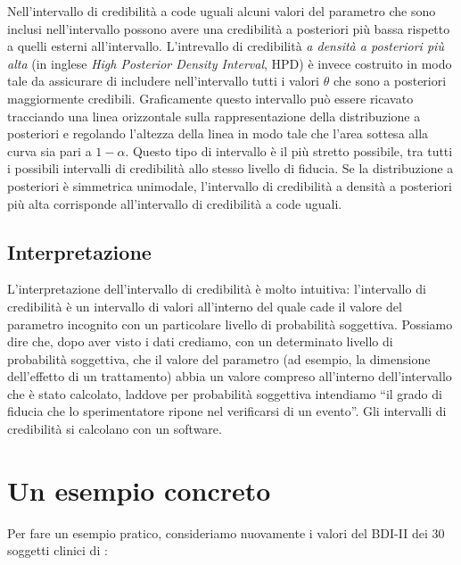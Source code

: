 \documentclass[
  11pt,
  italian,
  a4paper,
  extrafontsizes,onecolumn,openright
  ]{memoir}
\begin{document}
Nell'intervallo di credibilità a code uguali alcuni valori del parametro che sono inclusi nell'intervallo possono avere una credibilità a posteriori più bassa rispetto a quelli esterni all'intervallo. L'intrevallo di credibilità \emph{a densità a posteriori più alta} (in inglese \emph{High Posterior Density Interval}, HPD) è invece costruito in modo tale da assicurare di includere nell'intervallo tutti i valori \(\theta\) che sono a posteriori maggiormente credibili. Graficamente questo intervallo può essere ricavato tracciando una linea orizzontale sulla rappresentazione della distribuzione a posteriori e regolando l'altezza della linea in modo tale che l'area sottesa alla curva sia pari a \(1 - \alpha\). Questo tipo di intervallo è il più stretto possibile, tra tutti i possibili intervalli di credibilità allo stesso livello di fiducia. Se la distribuzione a posteriori è simmetrica unimodale, l'intervallo di credibilità a densità a posteriori più alta corrisponde all'intervallo di credibilità a code uguali.

\hypertarget{interpretazione}{%
\subsection{Interpretazione}\label{interpretazione}}

L'interpretazione dell'intervallo di credibilità è molto intuitiva:
l'intervallo di credibilità è un intervallo di valori all'interno del
quale cade il valore del parametro incognito con un particolare livello
di probabilità soggettiva. Possiamo dire che, dopo aver visto i dati
crediamo, con un determinato livello di probabilità soggettiva, che il
valore del parametro (ad esempio, la dimensione dell'effetto di un
trattamento) abbia un valore compreso all'interno dell'intervallo che è
stato calcolato, laddove per probabilità soggettiva intendiamo ``il grado di fiducia che lo sperimentatore ripone nel verificarsi di un evento''. Gli intervalli di credibilità si calcolano con un software.

\hypertarget{un-esempio-concreto}{%
\section{Un esempio concreto}\label{un-esempio-concreto}}

Per fare un esempio pratico, consideriamo nuovamente i valori del BDI-II dei 30 soggetti clinici di \textcite{zetschefuture2019}:
\end{document}
